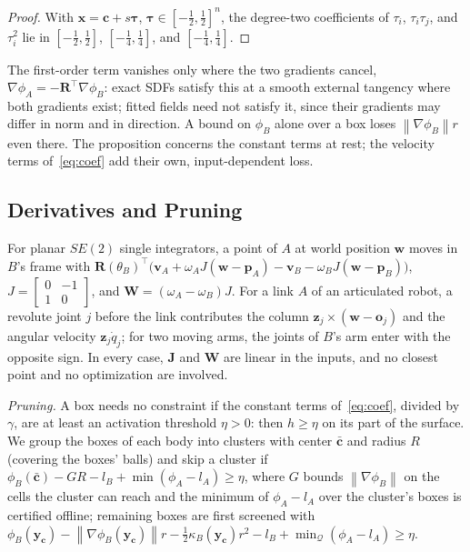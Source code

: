 \documentclass[journal]{IEEEtran}
\theoremstyle{definition}
\newcommand{\norm}[1]{\left\lVert #1\right\rVert}
\newcommand{\Rot}{\mathbf{R}}
\begin{document}
\begin{proof}
With $\mathbf x=\mathbf c+s\boldsymbol\tau$, $\boldsymbol\tau\in[-\frac12,\frac12]^n$, the degree-two
coefficients of $\tau_i$, $\tau_i\tau_j$, and $\tau_i^2$ lie in $[-\frac12,\frac12]$,
$[-\frac14,\frac14]$, and $[-\frac14,\frac14]$.
\end{proof}
The first-order term vanishes only where the two gradients cancel, $\nabla\phi_A=-\Rot^\top\nabla\phi_B$:
exact SDFs satisfy this at a smooth external tangency where both gradients exist; fitted fields
need not satisfy it, since
their gradients may differ in norm and in direction. A bound on $\phi_B$ alone over a box loses
$\norm{\nabla\phi_B}r$ even there. The proposition concerns the constant terms at rest; the velocity
terms of~\eqref{eq:coef} add their own, input-dependent loss.

\subsection{Derivatives and Pruning}\label{sec:cover-der}
For planar $SE(2)$ single integrators, a point of $A$ at world position $\mathbf w$ moves in $B$'s frame
with $\Rot(\theta_B)^{\!\top}\big(\mathbf v_A+\omega_AJ(\mathbf w-\mathbf p_A)-\mathbf v_B-\omega_BJ(\mathbf w-\mathbf p_B)\big)$,
$J=\left[\begin{smallmatrix}0&-1\\1&0\end{smallmatrix}\right]$, and
$\mathbf W=(\omega_A-\omega_B)J$. For a link $A$ of an articulated robot, a revolute joint $j$ before
the link contributes the column $\mathbf z_j\times(\mathbf w-\mathbf o_j)$ and the angular velocity
$\mathbf z_j\dot q_j$; for two moving arms, the joints of $B$'s arm enter with the opposite sign. In
every case, $\mathbf J$ and $\mathbf W$ are linear in the inputs, and no closest point and no
optimization are involved.

\emph{Pruning.} A box needs no constraint if the constant terms of~\eqref{eq:coef}, divided by
$\gamma$, are at least an activation threshold $\eta>0$: then $h\ge\eta$ on its part of the surface.
We group the boxes of each body into clusters with center $\bar{\mathbf c}$ and radius $R$ (covering
the boxes' balls) and skip a cluster if $\phi_B(\bar{\mathbf c})-GR-l_B+\min(\phi_A-l_A)\ge\eta$,
where $G$ bounds $\norm{\nabla\phi_B}$ on the cells the cluster can reach and the minimum of
$\phi_A-l_A$ over the cluster's boxes is certified offline; remaining boxes are first screened with
$\phi_B(\mathbf y_{\mathbf c})-\norm{\nabla\phi_B(\mathbf y_{\mathbf c})}r-\frac12\kappa_B(\mathbf y_{\mathbf c})r^2-l_B+\min_{\mathcal Q}(\phi_A-l_A)\ge\eta$.
\end{document}
